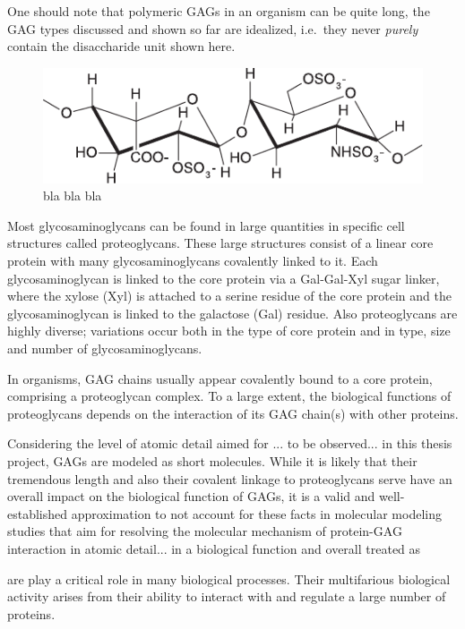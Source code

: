One should note that polymeric GAGs in an organism can be quite long, the GAG
types discussed and shown so far are idealized, i.e.\ they never \textit{purely}
contain the disaccharide unit shown here.


\begin{figure}
\centering
\includegraphics[width=1.0\textwidth]{gfx/background/hp_repeating_unit_structure_01.pdf}
\caption[]{
bla bla bla
}
\label{fig:bg:heparin_chemstruct}
\end{figure}


Most glycosaminoglycans can be found in large quantities in specific cell structures called proteoglycans. These large structures consist of a linear core protein with many glycosaminoglycans covalently linked to it. Each glycosaminoglycan is linked to the core protein via a Gal-Gal-Xyl sugar linker, where the xylose (Xyl) is attached to a serine residue of the core protein and the glycosaminoglycan is linked to the galactose (Gal) residue. Also proteoglycans are highly diverse; variations occur both in the type of core protein and in type, size and number of glycosaminoglycans.



In organisms, GAG chains usually
appear covalently bound to a core protein, comprising a proteoglycan complex.
To a large extent, the biological functions of proteoglycans depends on the
interaction of its GAG chain(s) with other proteins.



Considering the level of atomic detail aimed for ... to be observed... in this
thesis project, GAGs are modeled as short molecules. While it is likely
that their tremendous length and also their covalent linkage to proteoglycans
serve have an overall impact on the biological function of GAGs, it is a
valid and well-established approximation to not account for these facts in
molecular modeling studies that aim for resolving the molecular mechanism of
protein-GAG interaction in atomic detail... in a biological function and overall  treated as


are play a critical role in many biological processes.
Their multifarious biological activity arises from their ability to interact
with and regulate a large number of proteins.


